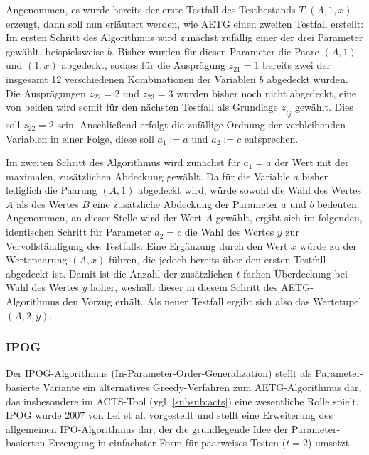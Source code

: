 Angenommen, es wurde bereits der erste Testfall des Testbestands $T$ $(A,1,x)$ erzeugt, dann soll nun erläutert werden, wie AETG einen zweiten Testfall erstellt: Im ersten Schritt des Algorithmus wird zunächst zufällig einer der drei Parameter gewählt, beispielsweise $b$. Bisher wurden für diesen Parameter die Paare $(A,1)$ und $(1,x)$ abgedeckt, sodass für die Ausprägung $z_{21} = 1$ bereits zwei der insgesamt 12 verschiedenen Kombinationen der Variablen $b$ abgedeckt wurden. Die Ausprägungen $z_{22} = 2$ und $z_{23} = 3$ wurden bisher noch nicht abgedeckt, eine von beiden wird somit für den nächsten Testfall als Grundlage $z_{\tilde{i}\tilde{j}}$ gewählt. Dies soll $z_{22} = 2$ sein. Anschließend erfolgt die zufällige Ordnung der verbleibenden Variablen in einer Folge, diese soll $a_1 := a$ und $a_2 := c$ entsprechen.

Im zweiten Schritt des Algorithmus wird zunächst für $a_1 = a$ der Wert mit der maximalen, zusätzlichen Abdeckung gewählt. Da für die Variable $a$ bisher lediglich die Paarung $(A,1)$ abgedeckt wird, würde sowohl die Wahl des Wertes $A$ als des Wertes $B$ eine zusätzliche Abdeckung der Parameter $a$ und $b$ bedeuten. Angenommen, an dieser Stelle wird der Wert $A$ gewählt, ergibt sich im folgenden, identischen Schritt für Parameter $a_2 = c$ die Wahl des Wertes $y$ zur Vervollständigung des Testfalls: Eine Ergänzung durch den Wert $x$ würde zu der Wertepaarung $(A,x)$ führen, die jedoch bereits über den ersten Testfall abgedeckt ist. Damit ist die Anzahl der zusätzlichen $t$-fachen Überdeckung bei Wahl des Wertes $y$ höher, weshalb dieser in diesem Schritt des AETG-Algorithmus den Vorzug erhält. Als neuer Testfall ergibt sich also das Wertetupel $(A, 2, y)$.

\subsubsection{IPOG}\label{subsub:ipog}

Der IPOG-Algorithmus (In-Parameter-Order-Generalization) stellt als Parameter-basierte Variante ein alternatives Greedy-Verfahren zum AETG-Algorithmus dar, das insbesondere im ACTS-Tool (vgl. \autoref{subsub:acts}) eine wesentliche Rolle spielt. IPOG wurde 2007 von Lei et al. \cite{lei2008ipog} vorgestellt und stellt eine Erweiterung des allgemeinen IPO-Algorithmus \cite{lei1998parameter} dar, der die grundlegende Idee der Parameter-basierten Erzeugung in einfachster Form für paarweises Testen ($t=2$) umsetzt.

